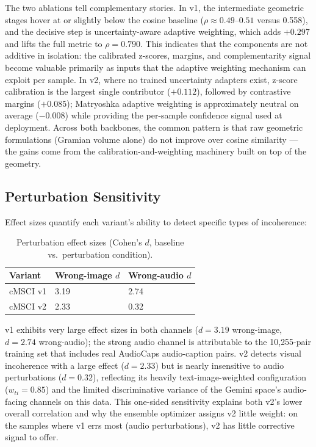 \documentclass[a4paper,fleqn]{cas-sc}
\begin{document}
\begin{itemize}
The two ablations tell complementary stories. In v1, the intermediate geometric stages hover at or slightly below the cosine baseline ($\rho \approx 0.49$--$0.51$ versus 0.558), and the decisive step is uncertainty-aware adaptive weighting, which adds $+0.297$ and lifts the full metric to $\rho = 0.790$. This indicates that the components are not additive in isolation: the calibrated z-scores, margins, and complementarity signal become valuable primarily as inputs that the adaptive weighting mechanism can exploit per sample. In v2, where no trained uncertainty adapters exist, z-score calibration is the largest single contributor ($+0.112$), followed by contrastive margins ($+0.085$); Matryoshka adaptive weighting is approximately neutral on average ($-0.008$) while providing the per-sample confidence signal used at deployment. Across both backbones, the common pattern is that raw geometric formulations (Gramian volume alone) do not improve over cosine similarity — the gains come from the calibration-and-weighting machinery built on top of the geometry.

\subsection{Perturbation Sensitivity}\label{sec:perturbation-sensitivity}

Effect sizes quantify each variant's ability to detect specific types of incoherence:

\begin{table}[t]
\caption{Perturbation effect sizes (Cohen's $d$, baseline vs.\ perturbation condition).}\label{tab:perturbation}
\centering
\begin{tabular}{lll}
\toprule
Variant & Wrong-image $d$ & Wrong-audio $d$ \\
\midrule
cMSCI v1 & 3.19 & 2.74 \\
cMSCI v2 & 2.33 & 0.32 \\
\bottomrule
\end{tabular}
\end{table}

v1 exhibits very large effect sizes in both channels ($d = 3.19$ wrong-image, $d = 2.74$ wrong-audio); the strong audio channel is attributable to the 10,255-pair training set that includes real AudioCaps audio-caption pairs. v2 detects visual incoherence with a large effect ($d = 2.33$) but is nearly insensitive to audio perturbations ($d = 0.32$), reflecting its heavily text-image-weighted configuration ($w_{ti} = 0.85$) and the limited discriminative variance of the Gemini space's audio-facing channels on this data. This one-sided sensitivity explains both v2's lower overall correlation and why the ensemble optimizer assigns v2 little weight: on the samples where v1 errs most (audio perturbations), v2 has little corrective signal to offer.


\end{itemize}
\end{document}
